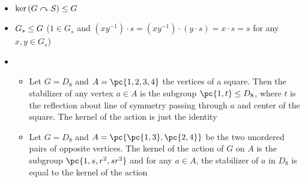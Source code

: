 \documentclass[11pt]{article}
\begin{document}
\begin{definition*}
\begin{enumerate}
    \end{enumerate}
    \begin{itemize}
        \item {} $\ker{(G\ensuremath{\curvearrowright}S)} \leq G$
        \item {} $G_s \leq G$ ($1\in G_s$ and $(xy^{-1}) \cdot s = (xy^{-1}) \cdot (y\cdot s) = x\cdot s = s$ for any $x,y\in G_s$)
        \item {}
        \begin{itemize}
            \item Let $G=D_8$ and $A =\pc{1,2,3,4}$ the vertices of a square. Then the stabilizer of any vertex $a\in A$ is the subgroup $\pc{1,t} \subgroup D_8$, where $t$ is the reflection about line of symmetry passing through $a$ and center of the square. The kernel of the action is just the identity
            \item Let $G=D_8$ and $A = \pc{\pc{1,3}, \pc{2,4}}$ be the two unordered pairs of opposite vertices. The kernel of the action of $G$ on $A$ is the subgroup $\pc{1,s,r^2,sr^2}$ and for any $a\in A$, the stabilizer of $a$ in $D_8$ is equal to the kernel of the action
        \end{itemize}
    \end{itemize}
\end{definition*}



\section{}
\end{document}
